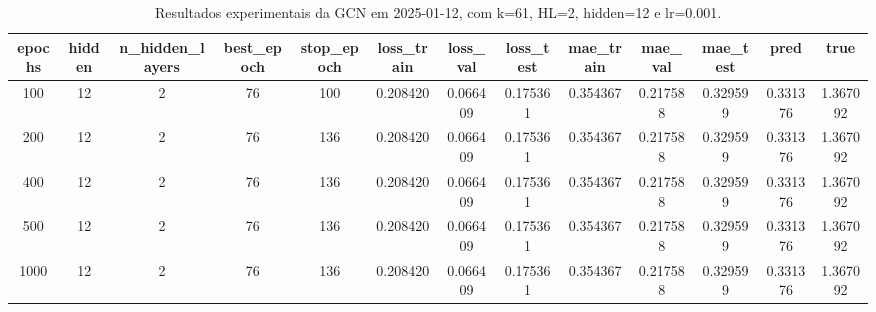 \begin{table}[h]
\centering
\caption{Resultados experimentais da GCN em 2025-01-12, com k=61, HL=2, hidden=12 e lr=0.001.}
\label{tab:gcn_results_k61_hl2_h12_d20250112}
\begin{tabular}{ccccccccccccc}
\toprule
epochs & hidden & n\_hidden\_layers & best\_epoch & stop\_epoch & loss\_train & loss\_val & loss\_test & mae\_train & mae\_val & mae\_test & pred & true \\
\midrule
100 & 12 & 2 & 76 & 100 & 0.208420 & 0.066409 & 0.175361 & 0.354367 & 0.217588 & 0.329599 & 0.331376 & 1.367092 \\
200 & 12 & 2 & 76 & 136 & 0.208420 & 0.066409 & 0.175361 & 0.354367 & 0.217588 & 0.329599 & 0.331376 & 1.367092 \\
400 & 12 & 2 & 76 & 136 & 0.208420 & 0.066409 & 0.175361 & 0.354367 & 0.217588 & 0.329599 & 0.331376 & 1.367092 \\
500 & 12 & 2 & 76 & 136 & 0.208420 & 0.066409 & 0.175361 & 0.354367 & 0.217588 & 0.329599 & 0.331376 & 1.367092 \\
1000 & 12 & 2 & 76 & 136 & 0.208420 & 0.066409 & 0.175361 & 0.354367 & 0.217588 & 0.329599 & 0.331376 & 1.367092 \\
\bottomrule
\end{tabular}
\end{table}

